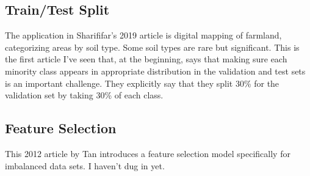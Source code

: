 \subsection{Train/Test Split}

The application in Sharififar's 2019 article \cite{SHARIFIFAR_2019}  is digital mapping of farmland, categorizing areas by soil type.  Some soil types are rare but significant.  This is the first article I've seen that, at the beginning, says that making sure each minority class appears in appropriate distribution in the validation and test sets is an important challenge.  They explicitly say that they split 30\% for the validation set by taking 30\% of each class.

\subsection{Feature Selection}

This 2012 article by Tan \cite{TAN_2012} introduces a feature selection model specifically for imbalanced data sets.  I haven't dug in yet.  


